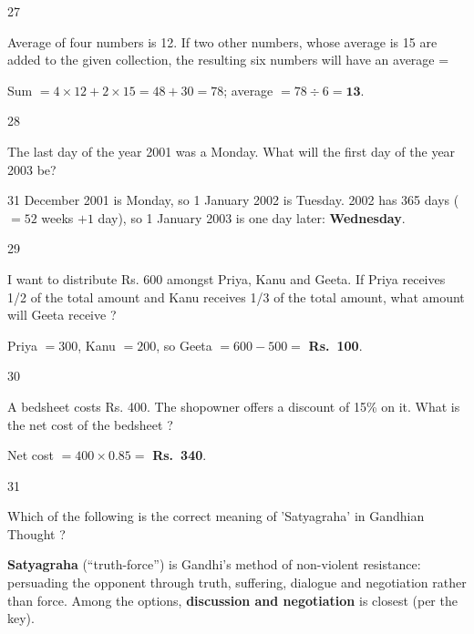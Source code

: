 \begin{question}{27}
{Average of four numbers is 12. If two other numbers, whose average is 15 are added to the given collection, the resulting six numbers will have an average =\par}
\begin{explain}
Sum $=4\times12+2\times15=48+30=78$; average $=78\div6=\mathbf{13}$.
\end{explain}
\end{question}

\begin{question}{28}
{The last day of the year 2001 was a Monday. What will the first day of the year 2003 be?\par}
\begin{explain}
31 December 2001 is Monday, so 1 January 2002 is Tuesday. 2002 has 365 days ($=52$ weeks $+1$ day), so 1 January 2003 is one day later: \textbf{Wednesday}.
\end{explain}
\end{question}

\begin{question}{29}
{I want to distribute Rs. 600 amongst Priya, Kanu and Geeta. If Priya receives 1/2 of the total amount and Kanu receives 1/3 of the total amount, what amount will Geeta receive ?\par}
\begin{explain}
Priya $=300$, Kanu $=200$, so Geeta $=600-500=$ \textbf{Rs.~100}.
\end{explain}
\end{question}

\begin{question}{30}
{A bedsheet costs Rs. 400. The shopowner offers a discount of 15\% on it. What is the net cost of the bedsheet ?\par}
\begin{explain}
Net cost $=400\times0.85=$ \textbf{Rs.~340}.
\end{explain}
\end{question}

\begin{question}{31}
{Which of the following is the correct meaning of 'Satyagraha' in Gandhian Thought ?\par}
\begin{explain}
\textbf{Satyagraha} (``truth-force'') is Gandhi's method of non-violent resistance: persuading the opponent through truth, suffering, dialogue and negotiation rather than force. Among the options, \textbf{discussion and negotiation} is closest (per the key).
\end{explain}
\end{question}

